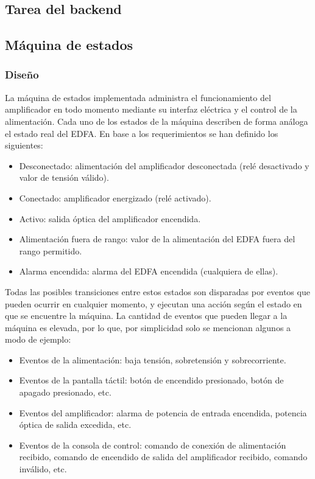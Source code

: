 \subsection{Tarea del backend}




\subsection{Máquina de estados}
\subsubsection{Diseño}

La máquina de estados implementada administra el funcionamiento del amplificador en todo momento mediante su interfaz eléctrica y el control de la alimentación. Cada uno de los estados de la máquina describen de forma análoga el estado real del EDFA. En base a los requerimientos se han definido los siguientes:

\begin{itemize}
\item Desconectado: alimentación del amplificador desconectada (relé desactivado y valor de tensión válido).
\item Conectado: amplificador energizado (relé activado).
\item Activo: salida óptica del amplificador encendida.
\item Alimentación fuera de rango: valor de la alimentación del EDFA fuera del rango permitido.
\item Alarma encendida: alarma del EDFA encendida (cualquiera de ellas).
\end{itemize}

Todas las posibles transiciones entre estos estados son disparadas por eventos que pueden ocurrir en cualquier momento, y ejecutan una acción según el estado en que se encuentre la máquina. La cantidad de eventos que pueden llegar a la máquina es elevada, por lo que, por simplicidad solo se mencionan algunos a modo de ejemplo:

\begin{itemize}
\item Eventos de la alimentación: baja tensión, sobretensión y sobrecorriente.
\item Eventos de la pantalla táctil: botón de encendido presionado, botón de apagado presionado, etc.
\item Eventos del amplificador: alarma de potencia de entrada encendida, potencia óptica de salida excedida, etc.
\item Eventos de la consola de control: comando de conexión de alimentación recibido, comando de encendido de salida del amplificador recibido, comando inválido, etc.
\end{itemize}

